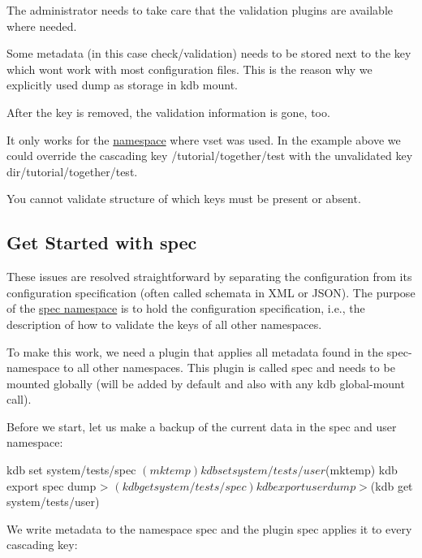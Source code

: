 \begin{DoxyItemize}
\item The administrator needs to take care that the validation plugins are available where needed.
\item Some metadata (in this case {\ttfamily check/validation}) needs to be stored next to the key which won\textquotesingle{}t work with most configuration files. This is the reason why we explicitly used {\ttfamily dump} as storage in {\ttfamily kdb mount}.
\item After the key is removed, the validation information is gone, too.
\item It only works for the \hyperlink{doc_tutorials_namespaces_md}{namespace} where {\ttfamily vset} was used. In the example above we could override the cascading key {\ttfamily /tutorial/together/test} with the unvalidated key {\ttfamily dir/tutorial/together/test}.
\item You cannot validate structure of which keys must be present or absent.
\end{DoxyItemize}

\subsection*{Get Started with {\ttfamily spec}}

These issues are resolved straightforward by separating the configuration from its configuration specification (often called schemata in X\+ML or J\+S\+ON). The purpose of the \hyperlink{doc_tutorials_namespaces_md}{spec namespace} is to hold the configuration specification, i.\+e., the description of how to validate the keys of all other namespaces.

To make this work, we need a plugin that applies all metadata found in the {\ttfamily spec}-\/namespace to all other namespaces. This plugin is called {\ttfamily spec} and needs to be mounted globally (will be added by default and also with any {\ttfamily kdb global-\/mount} call).

Before we start, let us make a backup of the current data in the spec and user namespace\+:


\begin{DoxyCode}
kdb set system/tests/spec $(mktemp)
kdb set system/tests/user $(mktemp)
kdb export spec dump > $(kdb get system/tests/spec)
kdb export user dump > $(kdb get system/tests/user)
\end{DoxyCode}


We write metadata to the namespace {\ttfamily spec} and the plugin {\ttfamily spec} applies it to every cascading key\+:


